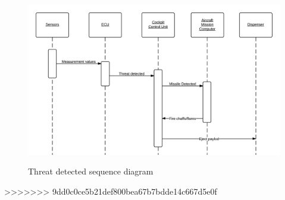 \begin{figure}[h]
	\centering
	\includegraphics[scale=0.15]{./images/threatDetectedSequenceDiagram.png}\\
	\caption{Threat detected sequence diagram}
    \label{fig:threatDetectedSeqDia}
\end{figure}

>>>>>>> 9dd0c0ce5b21def800bea67b7bdde14c667d5e0f
